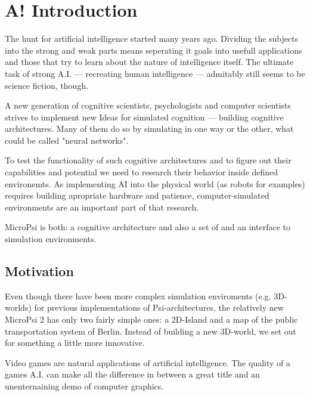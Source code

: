 \chapter{A! Introduction}
The hunt for artificial intelligence started many years ago. Dividing the subjects into the strong and weak parts means seperating it goals into usefull applications and those that try to learn about the nature of intelligence itself. The ultimate task of strong A.I. --- recreating human intelligence --- admitably still seems to be science fiction, though.

A new generation of cognitive scientists, psychologists and computer scientists strives to implement new Ideas for simulated cognition --- building cognitive architectures. Many of them do so by simulating in one way or the other, what could be called "neural networks".

To test the functionality of such cognitive architectures and to figure out their capabilities and potential we need to research their behavior inside defined environemts. As implementing AI into the physical world (as robots for examples) requires building apropriate hardware and patience, computer-simulated environments are an important part of that research.

MicroPsi is both: a cognitive architecture and also a set of and an interface to simulation environments.

\section{Motivation}
Even though there have been more complex simulation enviroments (e.g. 3D-worlds) for previous implementations of Psi-architectures, the relatively new MicroPsi 2 has only two fairly simple ones: a 2D-Island and a map of the public transportation system of Berlin. Instead of building a new 3D-world, we set out for something a little more innovative.

Video games are natural applications of artificial intelligence. The quality of a games A.I. can make all the difference in between a great title and an unenternaining demo of computer graphics.

